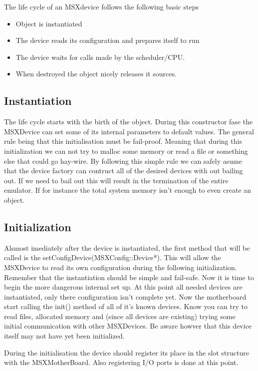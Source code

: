 \documentclass[11pt, a4paper]{report}
\begin{document}
The life cycle of an MSXdevice follows the following basic steps
\begin{itemize}
\item Object is instantiated
\item The device reads its configuration and prepares itself to run
\item The device waits for calls made by the scheduler/CPU.
\item When destroyed the object nicely releases it sources.
\end{itemize}

\subsection{Instantiation}
The life cycle starts with the birth of the object.
During this constructor fase the MSXDevice can set some of its internal parameters to default values. The general rule being that this initialisation must be fail-proof. Meaning that during this initialization we can not try to malloc some memory or read a file or something else that could go hay-wire. By following this simple rule we can safely asume that the device factory can contruct all of the desired devices with out bailing out.
If we need to bail out this will result in the termination of the entire emulator. If for instance the total system memory isn't enough to even create an object.

\subsection{Initialization}
Alsmost imediately after the device is instantiated, the first method that will be called is the setConfigDevice(MSXConfig::Device*). This will allow the MSXDevice to read its own configuration during the following initialization. Remember that the instantiation should be simple and fail-safe. Now it is time to begin the more dangerous internal set up. At this point all needed devices are instantiated, only there configuration isn't complete yet. Now the motherboard start calling the init() method of all of it's known devices.
Know you can try to read files, allocated memory and (since all devices are existing) trying some initial communication with other MSXDevices. Be aware howver that this device itself may not have yet been initialized.

During the initialisation the device should register its place in the slot structure with the MSXMotherBoard. Also registering I/O ports is done at this point.
\end{document}
